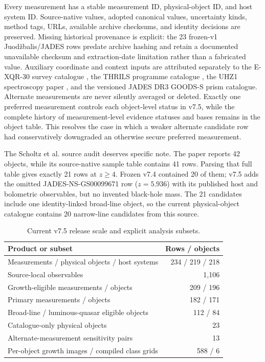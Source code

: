 \documentclass[11pt]{article}
\begin{document}
Every measurement has a stable measurement ID, physical-object ID, and host
system ID. Source-native values, adopted canonical values, uncertainty kinds,
method tags, URLs, available archive checksums, and identity decisions are
preserved. Missing historical provenance is explicit: the 23 frozen-v1
Juod\v{z}balis/JADES rows predate archive hashing and retain a documented
unavailable checksum and extraction-date limitation rather than a fabricated
value. Auxiliary coordinate and context inputs are attributed separately to the
E-XQR-30 survey catalogue \cite{dodorico2023}, the THRILS programme catalogue
\cite{hutchison2025}, the UHZ1 spectroscopy paper \cite{goulding2023}, and the
versioned JADES DR3 GOODS-S prism catalogue.
Alternate measurements are never silently averaged or deleted. Exactly one
preferred measurement controls each object-level status in v7.5, while the
complete history of measurement-level evidence statuses and bases remains in the
object table. This resolves the case in which a weaker alternate candidate row
had conservatively downgraded an otherwise secure preferred measurement.

The Scholtz et al. source audit deserves specific note. The paper reports 42
objects, while its source-native sample table contains 41 rows. Parsing that full
table gives exactly 21 rows at $z\geq4$. Frozen v7.4 contained 20 of them; v7.5
adds the omitted JADES-NS-GS00099671 row ($z=5.936$) with its published host and
bolometric observables, but no invented black-hole mass. The 21 candidates
include one identity-linked broad-line object, so the current physical-object
catalogue contains 20 narrow-line candidates from this source.

\begin{table}[ht]
\centering
\caption{Current v7.5 release scale and explicit analysis subsets.}
\begin{tabular}{@{}lr@{}}
\toprule
Product or subset & Rows / objects \\
\midrule
Measurements / physical objects / host systems & 234 / 219 / 218 \\
Source-local observables & 1,106 \\
Growth-eligible measurements / objects & 209 / 196 \\
Primary measurements / objects & 182 / 171 \\
Broad-line / luminous-quasar eligible objects & 112 / 84 \\
Catalogue-only physical objects & 23 \\
Alternate-measurement sensitivity pairs & 13 \\
Per-object growth images / compiled class grids & 588 / 6 \\
\bottomrule
\end{tabular}
\end{table}
\end{document}
